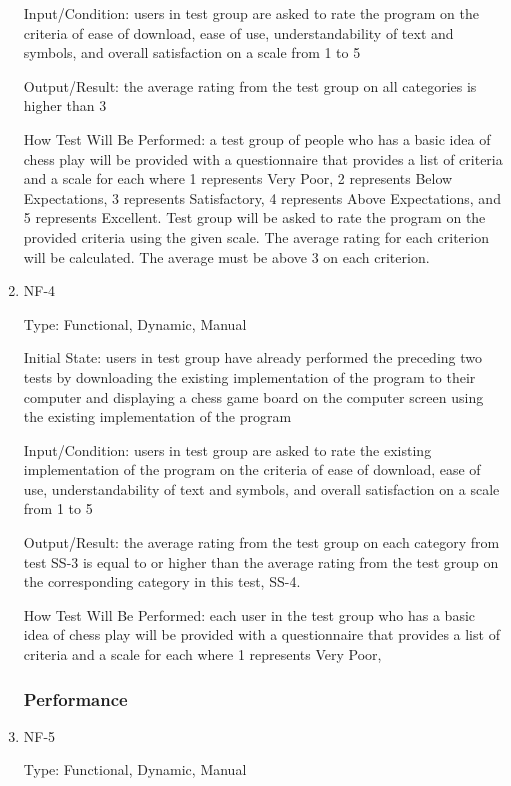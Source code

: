 \documentclass[12pt, titlepage]{article}
\begin{document}
\begin{enumerate}
Input/Condition: users in test group are asked to rate the program on the criteria of ease of download, ease of use, understandability of text and symbols, and overall satisfaction on a scale from 1 to 5

Output/Result: the average rating from the test group on all categories is higher than 3

How Test Will Be Performed: a test group of people who has a basic idea of chess play will be provided with a questionnaire that provides a list of criteria and a scale for each where 1 represents Very Poor, 2 represents Below Expectations, 3 represents Satisfactory, 4 represents Above Expectations, and 5 represents Excellent. Test group will be asked to rate the program on the provided criteria using the given scale. The average rating for each criterion will be calculated. The average must be above 3 on each criterion.


\item{NF-4\\}

Type: Functional, Dynamic, Manual

Initial State: users in test group have already performed the preceding two tests by downloading the existing implementation of the program to their computer and displaying a chess game board on the computer screen using the existing implementation of the program

Input/Condition: users in test group are asked to rate the existing implementation of the program on the criteria of ease of download, ease of use, understandability of text and symbols, and overall satisfaction on a scale from 1 to 5

Output/Result: the average rating from the test group on each category from test SS-3 is equal to or higher than the average rating from the test group on the corresponding category in this test, SS-4.

How Test Will Be Performed: each user in the test group who has a basic idea of chess play will be provided with a questionnaire that provides a list of criteria and a scale for each where 1 represents Very Poor, 

\subsubsection{Performance}

\item{NF-5\\}

Type: Functional, Dynamic, Manual


\end{enumerate}
\end{document}
